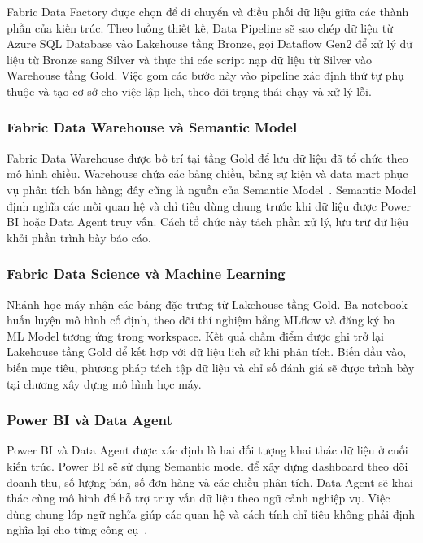 Fabric Data Factory được chọn để di chuyển và điều phối dữ liệu giữa các thành phần của kiến trúc. Theo luồng thiết kế, Data Pipeline sẽ sao chép dữ liệu từ Azure SQL Database vào Lakehouse tầng Bronze, gọi Dataflow Gen2 để xử lý dữ liệu từ Bronze sang Silver và thực thi các script nạp dữ liệu từ Silver vào Warehouse tầng Gold. Việc gom các bước này vào pipeline xác định thứ tự phụ thuộc và tạo cơ sở cho việc lập lịch, theo dõi trạng thái chạy và xử lý lỗi.

\subsubsection{Fabric Data Warehouse và Semantic Model}

Fabric Data Warehouse được bố trí tại tầng Gold để lưu dữ liệu đã tổ chức theo mô hình chiều. Warehouse chứa các bảng chiều, bảng sự kiện và data mart phục vụ phân tích bán hàng; đây cũng là nguồn của Semantic Model~\citep{microsoft-warehouse}. Semantic Model định nghĩa các mối quan hệ và chỉ tiêu dùng chung trước khi dữ liệu được Power BI hoặc Data Agent truy vấn. Cách tổ chức này tách phần xử lý, lưu trữ dữ liệu khỏi phần trình bày báo cáo.

\subsubsection{Fabric Data Science và Machine Learning}

Nhánh học máy nhận các bảng đặc trưng từ Lakehouse tầng Gold. Ba notebook huấn luyện mô hình cố định, theo dõi thí nghiệm bằng MLflow và đăng ký ba ML Model tương ứng trong workspace. Kết quả chấm điểm được ghi trở lại Lakehouse tầng Gold để kết hợp với dữ liệu lịch sử khi phân tích. Biến đầu vào, biến mục tiêu, phương pháp tách tập dữ liệu và chỉ số đánh giá sẽ được trình bày tại chương xây dựng mô hình học máy.

\subsubsection{Power BI và Data Agent}

Power BI và Data Agent được xác định là hai đối tượng khai thác dữ liệu ở cuối kiến trúc. Power BI sẽ sử dụng Semantic model để xây dựng dashboard theo dõi doanh thu, số lượng bán, số đơn hàng và các chiều phân tích. Data Agent sẽ khai thác cùng mô hình để hỗ trợ truy vấn dữ liệu theo ngữ cảnh nghiệp vụ. Việc dùng chung lớp ngữ nghĩa giúp các quan hệ và cách tính chỉ tiêu không phải định nghĩa lại cho từng công cụ~\citep{microsoft-fabric}.
